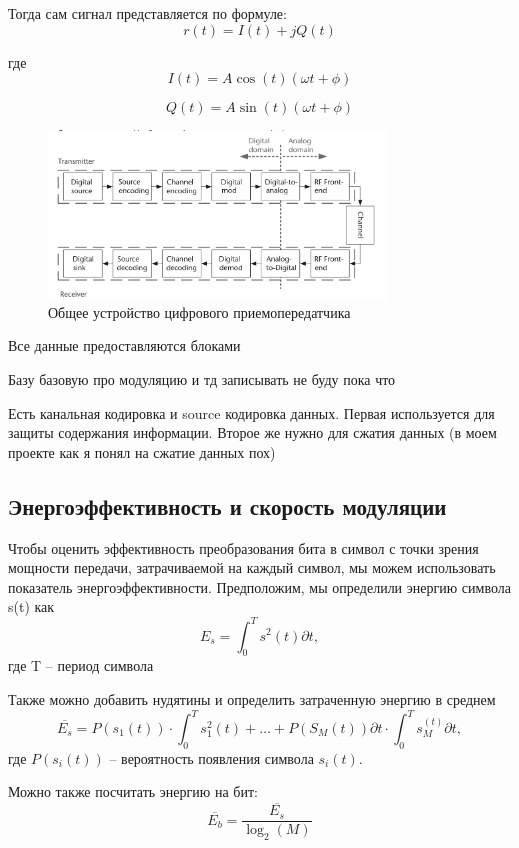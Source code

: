 \documentclass[14pt, report]{extarticle}
\begin{document}
Тогда сам сигнал представляется по формуле:
\[
r(t) = I(t) + jQ(t)  
\]

где
\[
I(t) = A\cos(t)(\omega t+ \phi)  
\]

\[
Q(t) = A\sin(t)(\omega t+ \phi)  
\]

\begin{figure}[h]
  \centering
  \includegraphics[width=0.8\textwidth]{../transmitter.png}
  \caption{Общее устройство цифрового приемопередатчика}
\end{figure}

\par Все данные предоставляются блоками

\par Базу базовую про модуляцию и тд записывать не буду пока что

\par Есть канальная кодировка и source кодировка данных.
Первая используется для защиты содержания информации. 
Второе же нужно для сжатия данных
(в моем проекте как я понял на сжатие данных пох)
\newpage

\subsection{Энергоэффективность и скорость модуляции}
Чтобы оценить эффективность преобразования бита в символ 
с точки зрения мощности передачи, затрачиваемой на каждый символ,
мы можем использовать показатель энергоэффективности. 
Предположим, мы определили энергию символа s(t) как
$$
E_s = \int_{0}^{T} s^2(t) \partial t,
$$
где T -- период символа

Также можно добавить нудятины и определить затраченную энергию в среднем
$$
\overline{E_s} = \mathit{P(s_1(t))} \cdot \int_{0}^{T} s_1^2(t) + \dots + P(S_M(t))\partial t \cdot \int_{0}^{T} s_M^(t) \partial t,
$$
где $P(s_i(t))$ -- вероятность появления символа $s_i(t)$.

Можно также посчитать энергию на бит:
$$
\overline{E_b} = \frac{\overline{E_s}}{\log_2(M)}
$$
\end{document}

